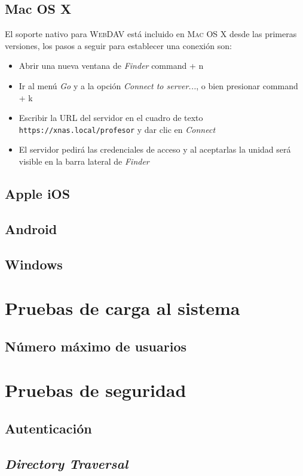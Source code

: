       \subsection {Mac OS X}

El soporte nativo para \textsc{WebDAV} est\'{a} incluido en \textsc{Mac OS X} desde las primeras versiones, los pasos a seguir para establecer una conexi\'{o}n son:

\begin{itemize}
  \item Abrir una nueva ventana de \textsl{Finder} command + n
  \item Ir al men\'{u} \textsl{Go} y a la opci\'{o}n \textsl{Connect to server...}, o bien presionar command + k
  \item Escribir la URL del servidor en el cuadro de texto \texttt{https://xnas.local/profesor} y dar clic en \textsl{Connect}
  \item El servidor pedir\'{a} las credenciales de acceso y al aceptarlas la unidad ser\'{a} visible en la barra lateral de \textsl{Finder}
\end{itemize}

      \subsection {Apple iOS}
      \subsection {Android}
      \subsection {Windows}
    \section {Pruebas de carga al sistema}
      \subsection {N\'{u}mero m\'{a}ximo de usuarios}
    \section {Pruebas de seguridad}
      \subsection {Autenticaci\'{o}n}
      \subsection {\textit{Directory Traversal}}

